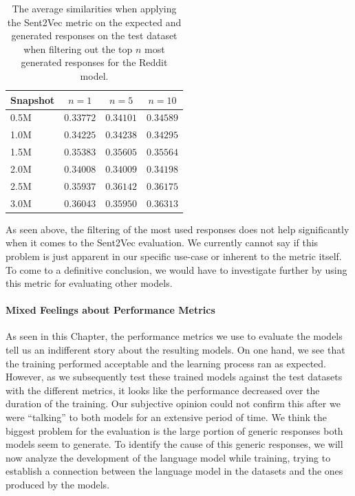 \begin{table}[H]
	\centering
	\begin{adjustbox}{max width=\textwidth}
		\begin{tabular}{lccc}
			\toprule
			Snapshot & $n = 1$ & $n = 5$ & $n = 10$\\
			\midrule
			0.5M & $0.33772$ & $0.34101$ & $0.34589$\\
			1.0M & $0.34225$ & $0.34238$ & $0.34295$\\
			1.5M & $0.35383$ & $0.35605$ & $0.35564$\\
			2.0M & $0.34008$ & $0.34009$ & $0.34198$\\
			2.5M & $0.35937$ & $0.36142$ & $0.36175$\\
			3.0M & $0.36043$ & $0.35950$ & $0.36313$\\
			\bottomrule
		\end{tabular}
	\end{adjustbox}
	\caption{The average similarities when applying the Sent2Vec metric on the expected and generated responses on the test dataset when filtering out the top $n$ most generated responses for the Reddit model.}
	\label{results:sent2vec:reddit:top_n_results_table}
\end{table}

As seen above, the filtering of the most used responses does not help significantly when it comes to the Sent2Vec evaluation. We currently cannot say if this problem is just apparent in our specific use-case or inherent to the metric itself. To come to a definitive conclusion, we would have to investigate further by using this metric for evaluating other models.

\paragraph{Mixed Feelings about Performance Metrics} As seen in this Chapter, the performance metrics we use to evaluate the models tell us an indifferent story about the resulting models. On one hand, we see that the training performed acceptable and the learning process ran as expected. However, as we subsequently test these trained models against the test datasets with the different metrics, it looks like the performance decreased over the duration of the training. Our subjective opinion could not confirm this after we were ``talking'' to both models for an extensive period of time. We think the biggest problem for the evaluation is the large portion of generic responses both models seem to generate. To identify the cause of this generic responses, we will now analyze the development of the language model while training, trying to establish a connection between the language model in the datasets and the ones produced by the models.

